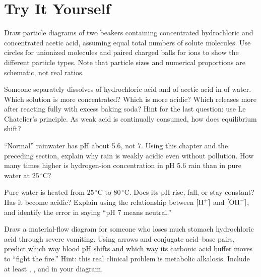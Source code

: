 \section*{Try It Yourself}

\begin{sikaoti}
\item Draw particle diagrams of two beakers containing concentrated hydrochloric and concentrated acetic acid, assuming equal total numbers of solute molecules. Use circles for unionized molecules and paired charged balls for ions to show the different particle types. Note that particle sizes and numerical proportions are schematic, not real ratios.
\item Someone separately dissolves  of hydrochloric acid and  of acetic acid in  of water. Which solution is more concentrated? Which is more acidic? Which releases more  after reacting fully with excess baking soda? Hint for the last question: use Le Chatelier's principle. As weak acid is continually consumed, how does equilibrium shift?
\item ``Normal'' rainwater has pH about 5.6, not 7. Using this chapter and the preceding section, explain why rain is weakly acidic even without pollution. How many times higher is hydrogen-ion concentration in pH 5.6 rain than in pure water at $25\,^{\circ}\mathrm{C}$?
\item Pure water is heated from $25\,^{\circ}\mathrm{C}$ to $80\,^{\circ}\mathrm{C}$. Does its pH rise, fall, or stay constant? Has it become acidic? Explain using the relationship between $[\mathrm{H^+}]$ and $[\mathrm{OH^-}]$, and identify the error in saying ``pH 7 means neutral.''
\item Draw a material-flow diagram for someone who loses much stomach hydrochloric acid through severe vomiting. Using arrows and conjugate acid--base pairs, predict which way blood pH shifts and which way its carbonic acid buffer moves to ``fight the fire.'' Hint: this real clinical problem is metabolic alkalosis. Include at least , , and  in your diagram.
\end{sikaoti}
